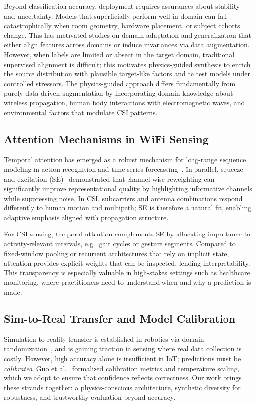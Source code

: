 \documentclass[journal]{IEEEtran}
\begin{document}
Beyond classification accuracy, deployment requires assurances about stability and uncertainty. Models that superficially perform well in-domain can fail catastrophically when room geometry, hardware placement, or subject cohorts change. This has motivated studies on domain adaptation and generalization that either align features across domains or induce invariances via data augmentation. However, when labels are limited or absent in the target domain, traditional supervised alignment is difficult; this motivates physics-guided synthesis to enrich the source distribution with plausible target-like factors and to test models under controlled stressors. The physics-guided approach differs fundamentally from purely data-driven augmentation by incorporating domain knowledge about wireless propagation, human body interactions with electromagnetic waves, and environmental factors that modulate CSI patterns.

\subsection{Attention Mechanisms in WiFi Sensing}
Temporal attention has emerged as a robust mechanism for long-range sequence modeling in action recognition and time-series forecasting~\cite{li2020tea,bertasius2021timesformer,lim2021tft,zhou2021informer}. In parallel, squeeze-and-excitation (SE)~\cite{se_networks2018} demonstrated that channel-wise reweighting can significantly improve representational quality by highlighting informative channels while suppressing noise. In CSI, subcarriers and antenna combinations respond differently to human motion and multipath; SE is therefore a natural fit, enabling adaptive emphasis aligned with propagation structure.

For CSI sensing, temporal attention complements SE by allocating importance to activity-relevant intervals, e.g., gait cycles or gesture segments. Compared to fixed-window pooling or recurrent architectures that rely on implicit state, attention provides explicit weights that can be inspected, lending interpretability. This transparency is especially valuable in high-stakes settings such as healthcare monitoring, where practitioners need to understand when and why a prediction is made.

\subsection{Sim-to-Real Transfer and Model Calibration}
Simulation-to-reality transfer is established in robotics via domain randomization~\cite{peng2018sim2real}, and is gaining traction in sensing where real data collection is costly. However, high accuracy alone is insufficient in IoT; predictions must be \emph{calibrated}. Guo et al.~\cite{calibration_guo2017} formalized calibration metrics and temperature scaling, which we adopt to ensure that confidence reflects correctness. Our work brings these strands together: a physics-conscious architecture, synthetic diversity for robustness, and trustworthy evaluation beyond accuracy.
\end{document}

